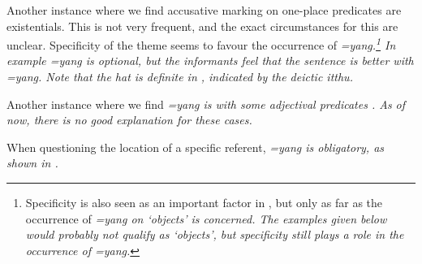 Another instance where we find accusative marking on one-place predicates are existentials. This is not very frequent, and the exact circumstances for this are unclear. Specificity of the theme seems to favour the occurrence of \em =yang\em.\footnote{Specificity is also seen as an important factor in \citet{Ansaldo2005ms}, but only as far as the occurrence of \em =yang \em on `objects' is concerned. The examples given below would probably not qualify as `objects', but specificity still plays a role in the occurrence of \em =yang\em.} In example  \em =yang \em is optional, but the informants feel that the sentence is better with \em =yang\em. Note that the hat is definite in , indicated by the deictic \em itthu\em.




Another instance where we find \em =yang \em is with some adjectival predicates . As of now, there is no good explanation for these cases.






When questioning the location of a specific referent, \em =yang \em is obligatory, as shown in .


